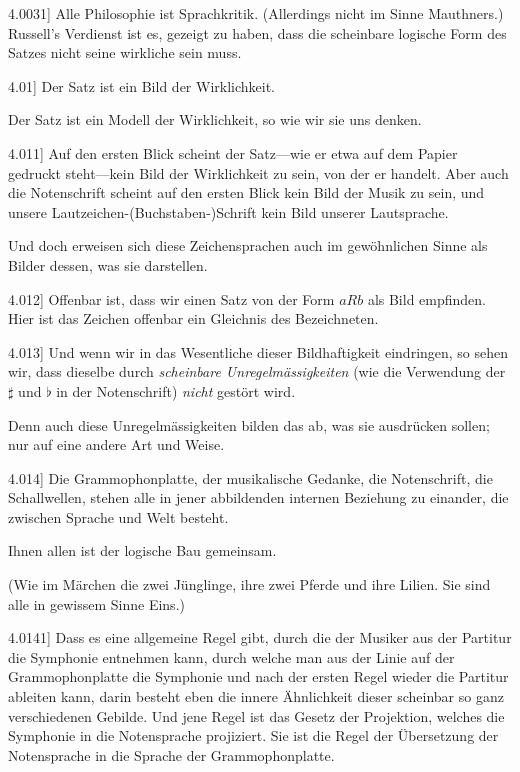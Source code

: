 \documentclass[12pt,oneside]{book}[2007/10/19]
\newcommand{\PropERef}[1]{\hyperref[PropE:#1]{#1}}
\newcommand{\PropositionG}[2]{%
  \item[\phantomsection\label{PropG:#1}\PropERef{#1}] #2%
}
\newcommand{\Emph}[1]{\emph{#1}}%
\newcommand{\AllowBreak}{\discretionary{}{}{}}
\begin{document}
\begin{propositions}
\PropositionG{4.0031}
{Alle Philosophie ist \glqq{}Sprachkritik\grqq{}. (Allerdings
nicht im Sinne Mauthners.) Russell's Verdienst ist
es, gezeigt zu haben, dass die scheinbare logische
Form des Satzes nicht seine wirkliche sein muss.}


\PropositionG{4.01}
{Der Satz ist ein Bild der Wirklichkeit.

Der Satz ist ein Modell der Wirklichkeit, so wie
wir sie uns denken.}


\PropositionG{4.011}
{Auf den ersten Blick scheint der Satz---wie er
etwa auf dem Papier gedruckt steht---kein Bild der
Wirklichkeit zu sein, von der er handelt. Aber
auch die Notenschrift scheint auf den ers\-ten Blick
kein Bild der Musik zu sein, und unsere Lautzeichen-\mbox{(Buchstaben-)}\AllowBreak{}Schrift
kein Bild unserer Lautsprache.

Und doch erweisen sich diese Zeichensprachen
auch im gewöhnlichen Sinne als Bilder dessen, was
sie darstellen.}


\PropositionG{4.012}
{Offenbar ist, dass wir einen Satz von der Form
\glqq{}$aRb$\grqq{} als Bild empfinden. Hier ist das Zeichen
offenbar ein Gleichnis des Bezeichneten.}


\PropositionG{4.013}
{Und wenn wir in das Wesentliche dieser Bildhaftigkeit
eindringen, so sehen wir, dass dieselbe
durch \Emph{scheinbare Unregelmässigkeiten}
(wie die Verwendung der $\sharp$ und $\flat$ in der Notenschrift)
\Emph{nicht} gestört wird.

Denn auch diese Unregelmässigkeiten bilden
das ab, was sie ausdrücken sollen; nur auf eine
andere Art und Weise.}


\PropositionG{4.014}
{Die Grammophonplatte, der musikalische Gedanke,
die Notenschrift, die Schallwellen, stehen
alle in jener abbildenden internen Beziehung zu
einander, die zwischen Sprache und Welt besteht.

Ihnen allen ist der logische Bau gemeinsam.

(Wie im Märchen die zwei Jünglinge, ihre zwei
Pferde und ihre Lilien. Sie sind alle in gewissem
Sinne Eins.)}


\PropositionG{4.0141}
{Dass es eine allgemeine Regel gibt, durch die
der Musiker aus der Partitur die Symphonie
entnehmen kann, durch welche man aus der Linie
auf der Grammophonplatte die Symphonie und
nach der ersten Regel wieder die Partitur ableiten
kann, darin besteht eben die innere Ähnlichkeit
dieser scheinbar so ganz verschiedenen Gebilde.
Und jene Regel ist das Gesetz der Projektion,
welches die Symphonie in die Notensprache projiziert.
Sie ist die Regel der Übersetzung der
Notensprache in die Sprache der Grammophonplatte.}



\end{propositions}
\end{document}
